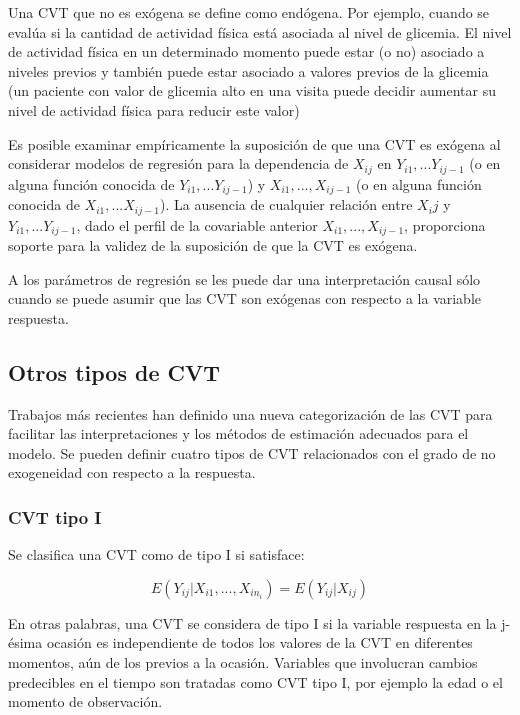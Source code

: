 \documentclass[spanish]{article}
\numberwithin{figure}{subsection}
\numberwithin{equation}{subsection}
\numberwithin{table}{subsection}
\begin{document}
Una CVT que no es exógena se define como endógena. Por ejemplo, cuando se
evalúa si la cantidad de actividad física está asociada al nivel de glicemia.
El nivel de actividad física en un determinado momento puede estar (o no)
asociado a niveles previos y también puede estar asociado a valores previos de
la glicemia (un paciente con valor de glicemia alto en una visita puede decidir
aumentar su nivel de actividad física para reducir este valor)

Es posible examinar empíricamente la suposición de que una CVT es exógena al
considerar modelos de regresión para la dependencia de $X_{ij}$ en
$Y_{i1}, ... Y_{ij-1}$ (o en alguna función conocida de
$Y_{i1}, ... Y_{ij-1}$) y $X_{i1}, ..., X_{ij-1}$ (o en alguna función conocida
de $X_{i1}, ... X_{ij-1}$). La ausencia de cualquier relación entre $X_ij$ y
$Y_{i1}, ... Y_{ij-1}$, dado el perfil de la covariable anterior
$X_{i1}, ..., X_{ij-1}$, proporciona soporte para la validez de la suposición
de que la CVT es exógena.

A los parámetros de regresión se les puede dar una interpretación causal sólo
cuando se puede asumir que las CVT son exógenas con respecto a la variable
respuesta.

\subsection{Otros tipos de CVT}

Trabajos más recientes han definido una nueva categorización de las CVT para
facilitar las interpretaciones y los métodos de estimación adecuados para el
modelo. Se pueden definir cuatro tipos de CVT relacionados con el grado de no
exogeneidad con respecto a la respuesta.

\subsubsection{CVT tipo I}

Se clasifica una CVT como de tipo I si satisface:

\begin{equation}
	\label{CVT tipo I}
	E(Y_{ij}|X_{i1}, ..., X_{in_i}) = E(Y_{ij}|X_{ij})
\end{equation}

En otras palabras, una CVT se considera de tipo I si la variable respuesta en
la j-ésima ocasión es independiente de todos los valores de la CVT en
diferentes momentos, aún de los previos a la ocasión. Variables que involucran
cambios predecibles en el tiempo son tratadas como CVT tipo I, por ejemplo la
edad o el momento de observación.
\end{document}
